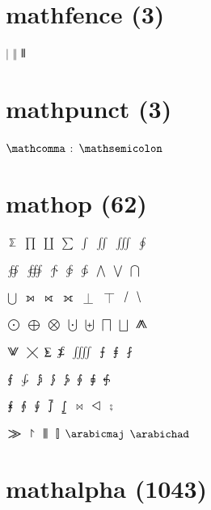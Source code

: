 \documentclass{article}
\begin{document}
\section*{mathfence (3)}

$\vert$ $\Vert$ $\Vvert$\par

\section*{mathpunct (3)}

$\mathcomma$ $\mathcolon$ $\mathsemicolon$\par

\section*{mathop (62)}

$\Bbbsum$ $\prod$ $\coprod$ $\sum$ $\int$ $\iint$ $\iiint$ $\oint$ \par
$\oiint$ $\oiiint$ $\intclockwise$ $\varointclockwise$ $\ointctrclockwise$ $\bigwedge$ $\bigvee$ $\bigcap$ \par
$\bigcup$ $\leftouterjoin$ $\rightouterjoin$ $\fullouterjoin$ $\bigbot$ $\bigtop$ $\xsol$ $\xbsol$ \par
$\bigodot$ $\bigoplus$ $\bigotimes$ $\bigcupdot$ $\biguplus$ $\bigsqcap$ $\bigsqcup$ $\conjquant$ \par
$\disjquant$ $\bigtimes$ $\modtwosum$ $\sumint$ $\iiiint$ $\intbar$ $\intBar$ $\fint$ \par
$\cirfnint$ $\awint$ $\rppolint$ $\scpolint$ $\npolint$ $\pointint$ $\sqint$ $\intlarhk$ \par
$\intx$ $\intcap$ $\intcup$ $\upint$ $\lowint$ $\Join$ $\bigtriangleleft$ $\zcmp$ \par
$\zpipe$ $\zproject$ $\biginterleave$ $\bigtalloblong$ $\arabicmaj$ $\arabichad$\par

\section*{mathalpha (1043)}
\end{document}
